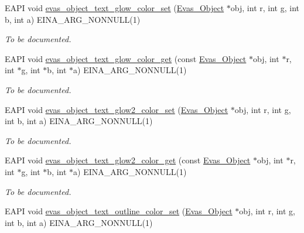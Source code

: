 \begin{DoxyCompactItemize}
EAPI void \hyperlink{group__Evas__Object__Text_ga74c4ea0f0befd6213f48163ee70041e6}{evas\_\-object\_\-text\_\-glow\_\-color\_\-set} (\hyperlink{group__Evas__Object__Group_ga9e19e6dd1f517a0ba437c0114d3e7c97}{Evas\_\-Object} $\ast$obj, int r, int g, int b, int a) EINA\_\-ARG\_\-NONNULL(1)
\begin{DoxyCompactList}\small\item\em To be documented. \item\end{DoxyCompactList}\item 
EAPI void \hyperlink{group__Evas__Object__Text_ga76bcc6322241875990b572f37d754266}{evas\_\-object\_\-text\_\-glow\_\-color\_\-get} (const \hyperlink{group__Evas__Object__Group_ga9e19e6dd1f517a0ba437c0114d3e7c97}{Evas\_\-Object} $\ast$obj, int $\ast$r, int $\ast$g, int $\ast$b, int $\ast$a) EINA\_\-ARG\_\-NONNULL(1)
\begin{DoxyCompactList}\small\item\em To be documented. \item\end{DoxyCompactList}\item 
EAPI void \hyperlink{group__Evas__Object__Text_ga7dabe4ce0120cdf0c4e60a8f7a7e3659}{evas\_\-object\_\-text\_\-glow2\_\-color\_\-set} (\hyperlink{group__Evas__Object__Group_ga9e19e6dd1f517a0ba437c0114d3e7c97}{Evas\_\-Object} $\ast$obj, int r, int g, int b, int a) EINA\_\-ARG\_\-NONNULL(1)
\begin{DoxyCompactList}\small\item\em To be documented. \item\end{DoxyCompactList}\item 
EAPI void \hyperlink{group__Evas__Object__Text_ga264a8425d8dab176a1b15e17a528d56d}{evas\_\-object\_\-text\_\-glow2\_\-color\_\-get} (const \hyperlink{group__Evas__Object__Group_ga9e19e6dd1f517a0ba437c0114d3e7c97}{Evas\_\-Object} $\ast$obj, int $\ast$r, int $\ast$g, int $\ast$b, int $\ast$a) EINA\_\-ARG\_\-NONNULL(1)
\begin{DoxyCompactList}\small\item\em To be documented. \item\end{DoxyCompactList}\item 
EAPI void \hyperlink{group__Evas__Object__Text_ga1c1cf05c6b31f06a4c79486d19ddaece}{evas\_\-object\_\-text\_\-outline\_\-color\_\-set} (\hyperlink{group__Evas__Object__Group_ga9e19e6dd1f517a0ba437c0114d3e7c97}{Evas\_\-Object} $\ast$obj, int r, int g, int b, int a) EINA\_\-ARG\_\-NONNULL(1)

\end{DoxyCompactItemize}
